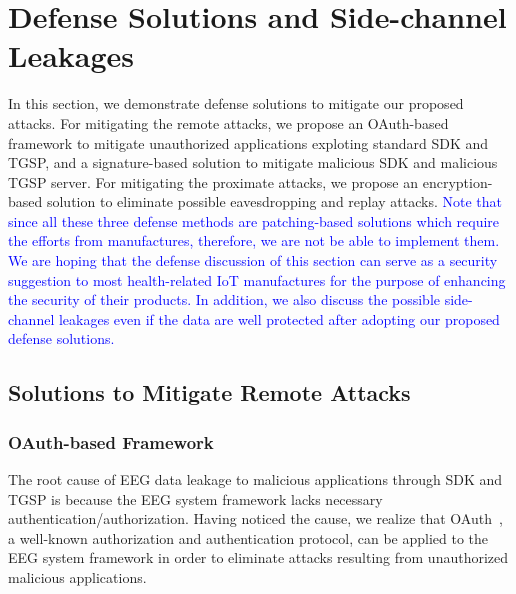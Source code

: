\section{Defense Solutions and Side-channel Leakages}
\label{sec:defense}

In this section, we demonstrate defense solutions to mitigate our proposed attacks. For mitigating the remote attacks, we propose an OAuth-based framework to mitigate unauthorized applications exploting standard SDK and TGSP, and a signature-based solution to mitigate malicious SDK and malicious TGSP server. For mitigating the proximate attacks, we propose an encryption-based solution to eliminate possible eavesdropping and replay attacks. \textcolor{blue}{Note that since all these three defense methods are patching-based solutions which require the efforts from manufactures, therefore, we are not be able to implement them. We are hoping that the defense discussion of this section can serve as a security suggestion to most health-related IoT manufactures for the purpose of enhancing the security of their products. In addition, we also discuss the possible side-channel leakages even if the data are well protected after adopting our proposed defense solutions.}

\subsection{Solutions to Mitigate Remote Attacks}

\subsubsection{OAuth-based Framework}
The root cause of EEG data leakage to malicious applications through SDK and TGSP is because the EEG system framework lacks necessary authentication/authorization. Having noticed the cause, we realize that OAuth~\cite{hardt2012oauth}, a well-known authorization and authentication protocol, can be applied to the EEG system framework in order to eliminate attacks resulting from unauthorized malicious applications.

